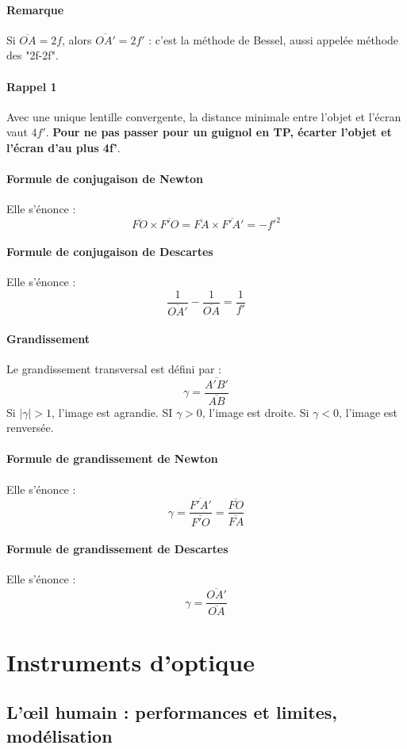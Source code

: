 \documentclass[french]{book}
\theoremstyle{plain}
\theoremstyle{definition}
\theoremstyle{remark}
\begin{document}
\paragraph{Remarque} Si $\overline{OA}=2f$, alors $\overline{OA'}=2f'$ : c'est la méthode de Bessel, aussi appelée méthode des "2f-2f".
\paragraph{Rappel 1} Avec une unique lentille convergente, la distance minimale entre l'objet et l'écran vaut $4f'$. \textbf{Pour ne pas passer pour un guignol en TP, écarter l'objet et l'écran d'au plus 4f'}.
\paragraph{Formule de conjugaison de Newton} Elle s'énonce : $$\overline{FO}\times\overline{F'O}=\overline{FA}\times\overline{F'A'}=-f'^2$$
\paragraph{Formule de conjugaison de Descartes} Elle s'énonce : $$\frac{1}{\overline{OA'}}-\frac{1}{\overline{OA}}=\frac{1}{f'}$$
\paragraph{Grandissement} Le grandissement transversal est défini par : $$\gamma=\frac{\overline{A'B'}}{\overline{AB}}$$ Si $\lvert\gamma\rvert>1$, l'image est agrandie. SI $\gamma >0$, l'image est droite. Si $\gamma <0$, l'image est renversée.
\paragraph{Formule de grandissement de Newton} Elle s'énonce : $$\gamma =\frac{\overline{F'A'}}{\overline{F'O}}=\frac{\overline{FO}}{\overline{FA}}$$
\paragraph{Formule de grandissement de Descartes}Elle s'énonce : $$\gamma=\frac{\overline{OA'}}{\overline{OA}}$$
\section{Instruments d'optique}
\subsection{L'œil humain : performances et limites, modélisation}
\end{document}
